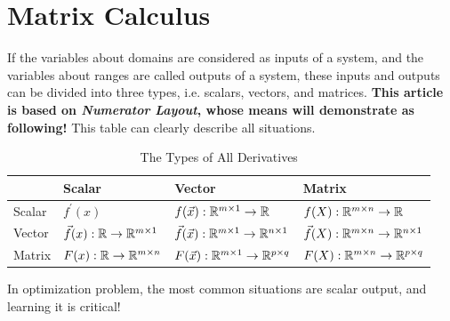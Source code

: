 	\section{Matrix Calculus}
	If the variables about domains are considered as inputs of a system, and the variables about ranges are called outputs of a system, these inputs and outputs can be divided into three types, i.e. scalars, vectors, and matrices. 
	\textbf{This article is based on \emph{Numerator Layout}, whose means will demonstrate as following!}
	This table can clearly describe all situations.
	 \begin{table}[!htp]
		\centering
		\caption{The Types of All Derivatives} 
		\begin{tabular}{l|l|l|l}
			\hline
			\diagbox{Output}{Input}& Scalar  & Vector & Matrix \\
			\hline
			Scalar & $f^{'}(x)$ & $f(\vec x):\mathbb{R}^{m\times 1}\rightarrow \mathbb{R}$ & $f(X):\mathbb{R}^{m\times n}\rightarrow \mathbb{R}$ \\
			\hline
			Vector & $\vec f(x):\mathbb{R}\rightarrow \mathbb{R}^{m\times 1}$ & $\vec f(\vec x):\mathbb{R}^{m\times 1}\rightarrow \mathbb{R}^{n\times 1}$ & $\vec f(X):\mathbb{R}^{m\times n}\rightarrow \mathbb{R}^{n\times 1}$ \\
			\hline
			Matrix & $F(x):\mathbb{R}\rightarrow \mathbb{R}^{m\times n}$ & $F(\vec x):\mathbb{R}^{m\times 1}\rightarrow \mathbb{R}^{p\times q}$ & $F(X):\mathbb{R}^{m\times n}\rightarrow \mathbb{R}^{p\times q}$ \\
			\hline
		\end{tabular}
	\end{table}
	In optimization problem, the most common situations are scalar output, and learning it is critical!
	
